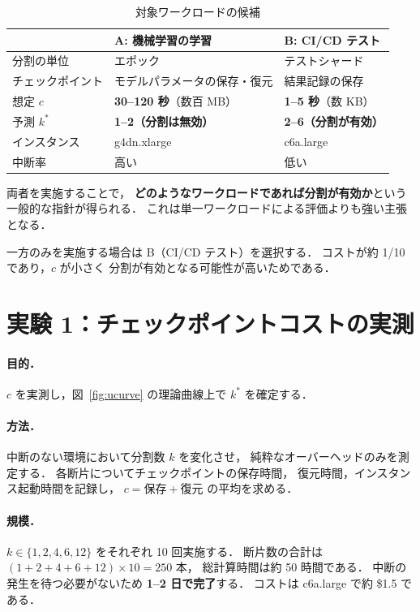 \documentclass[11pt,a4paper]{ltjsreport}
\begin{document}
\begin{table}[htbp]
\centering
\caption{対象ワークロードの候補}
\label{tab:usecases}
\small
\begin{tabularx}{\textwidth}{@{}lXX@{}}
\toprule
 & \textbf{A: 機械学習の学習} & \textbf{B: CI/CD テスト} \\
\midrule
分割の単位   & エポック & テストシャード \\
チェックポイント & モデルパラメータの保存・復元 & 結果記録の保存 \\
想定 $c$     & \textbf{30--120 秒}（数百 MB） & \textbf{1--5 秒}（数 KB） \\
予測 $k^{*}$ & \textbf{1--2（分割は無効）} & \textbf{2--6（分割が有効）} \\
インスタンス & g4dn.xlarge & c6a.large \\
中断率       & 高い & 低い \\
\bottomrule
\end{tabularx}
\end{table}

両者を実施することで，
\textbf{どのようなワークロードであれば分割が有効か}という
一般的な指針が得られる．
これは単一ワークロードによる評価よりも強い主張となる．

一方のみを実施する場合は B（CI/CD テスト）を選択する．
コストが約 1/10 であり，$c$ が小さく
分割が有効となる可能性が高いためである．

\section{実験 1：チェックポイントコストの実測}

\paragraph{目的．}
$c$ を実測し，図~\ref{fig:ucurve} の理論曲線上で
$k^{*}$ を確定する．

\paragraph{方法．}
中断のない環境において分割数 $k$ を変化させ，
純粋なオーバーヘッドのみを測定する．
各断片についてチェックポイントの保存時間，
復元時間，インスタンス起動時間を記録し，
$c = \text{保存} + \text{復元}$ の平均を求める．

\paragraph{規模．}
$k \in \{1,2,4,6,12\}$ をそれぞれ 10 回実施する．
断片数の合計は $(1+2+4+6+12)\times 10 = 250$ 本，
総計算時間は約 50 時間である．
中断の発生を待つ必要がないため \textbf{1--2 日で完了}する．
コストは c6a.large で約 \$1.5 である．
\end{document}
